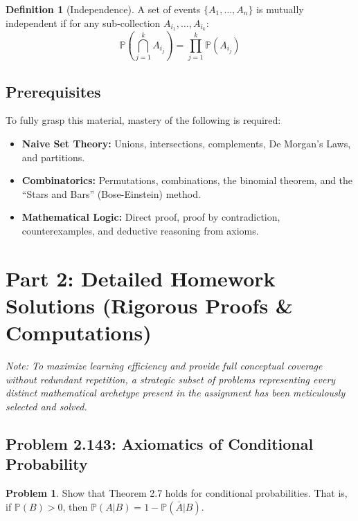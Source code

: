 \documentclass[11pt]{article}
\theoremstyle{definition}
\newtheorem{definition}{Definition}[section]
\newtheorem{problem}{Problem}[section]
\theoremstyle{remark}
\newcommand{\Prob}{\mathbb{P}}
\begin{document}
\begin{definition}[Independence]
A set of events $\{A_1, \dots, A_n\}$ is mutually independent if for any sub-collection $A_{i_1}, \dots, A_{i_k}$:
\[ \Prob\left(\bigcap_{j=1}^{k} A_{i_j}\right) = \prod_{j=1}^{k} \Prob(A_{i_j}) \]
\end{definition}

\subsection{Prerequisites}
To fully grasp this material, mastery of the following is required:
\begin{itemize}
    \item \textbf{Naive Set Theory:} Unions, intersections, complements, De Morgan's Laws, and partitions.
    \item \textbf{Combinatorics:} Permutations, combinations, the binomial theorem, and the ``Stars and Bars'' (Bose-Einstein) method.
    \item \textbf{Mathematical Logic:} Direct proof, proof by contradiction, counterexamples, and deductive reasoning from axioms.
\end{itemize}

\newpage
\section{Part 2: Detailed Homework Solutions (Rigorous Proofs \& Computations)}

\textit{Note: To maximize learning efficiency and provide full conceptual coverage without redundant repetition, a strategic subset of problems representing every distinct mathematical archetype present in the assignment has been meticulously selected and solved.}

\subsection{Problem 2.143: Axiomatics of Conditional Probability}
\begin{problem}
Show that Theorem 2.7 holds for conditional probabilities. That is, if $\Prob(B) > 0$, then $\Prob(A|B) = 1 - \Prob(\bar{A}|B)$.
\end{problem}
\end{document}
